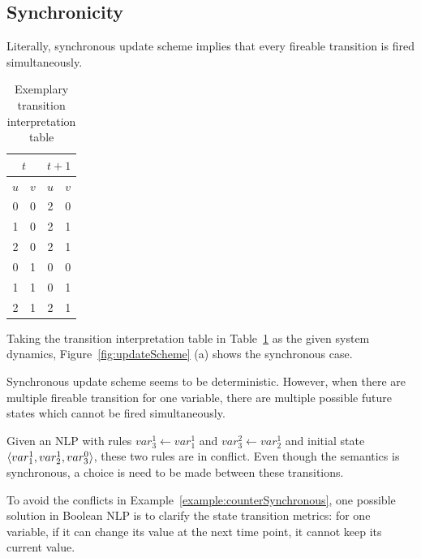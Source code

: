 

\subsection{Synchronicity}
Literally, synchronous update scheme implies that every fireable transition is fired simultaneously.

\begin{table}[ht]
    \centering
    \begin{tabular}{cc|cc}
        \multicolumn{2}{c|}{$t$}&\multicolumn{2}{c}{$t+1$}\\
        \hline
        $u$ & $v$ & $u$ & $v$ \\
        \hline
        0 & 0 & 2 & 0 \\
        1 & 0 & 2 & 1 \\
        2 & 0 & 2 & 1 \\
        0 & 1 & 0 & 0 \\
        1 & 1 & 0 & 1 \\
        2 & 1 & 2 & 1 \\
    \end{tabular}
    \caption{Exemplary transition interpretation table}
    \label{tab:transTable}
\end{table}


\begin{example}
Taking the transition interpretation table in Table~\ref{tab:transTable} as the given system dynamics, Figure~\ref{fig:updateScheme} (a) shows the synchronous case. 
\end{example}


Synchronous update scheme seems to be deterministic. 
However, when there are multiple fireable transition for one variable, there are multiple possible future states which cannot be fired simultaneously. 

\begin{example}\label{example:counterSynchronous}
Given an NLP with rules $var_3^1\gets var_1^1$ and $var_3^2 \gets var_2^1$
and initial state $\langle var_1^1, var_2^1, var_3^0\rangle$,
these two rules are in conflict.
Even though the semantics is synchronous, a choice is need to be made between these transitions.
\end{example}

To avoid the conflicts in Example~\ref{example:counterSynchronous}, one possible solution in Boolean NLP is to clarify the state transition metrics:
for one variable, if it can change its value at the next time point, it cannot keep its current value.

